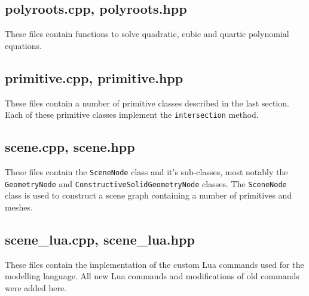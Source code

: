 \subsection*{polyroots.cpp, polyroots.hpp}
These files contain functions to solve quadratic, cubic and quartic polynomial
equations.

\subsection*{primitive.cpp, primitive.hpp}
These files contain a number of primitive classes described in the last section.
Each of these primitive classes implement the \verb|intersection| method.

\subsection*{scene.cpp, scene.hpp}
These files contain the \verb|SceneNode| class and it's sub-classes, most 
notably the \verb|GeometryNode| and \verb|ConstructiveSolidGeometryNode| 
classes. The \verb|SceneNode| class is used to construct a scene graph
containing a number of primitives and meshes.

\subsection*{scene\_lua.cpp, scene\_lua.hpp}
These files contain the implementation of the custom Lua commands used for the
modelling language. All new Lua commands and modifications of old commands were
added here.

